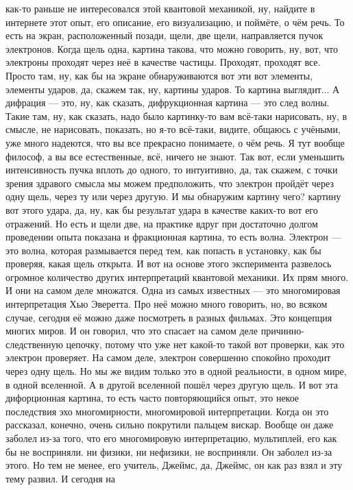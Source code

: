 как-то раньше не интересовался этой квантовой механикой, ну, найдите в интернете
этот опыт, его описание, его визуализацию, и поймёте, о чём речь. То есть на
экран, расположенный позади, щели, две щели, направляется пучок электронов.
Когда щель одна, картина такова, что можно говорить, ну, вот, что электроны
проходят через неё в качестве частицы. Проходят, проходят все. Просто там, ну,
как бы на экране обнаруживаются вот эти вот элементы, элементы ударов, да,
скажем так, ну, картины ударов. То картина выглядит... А дифрация — это, ну, как
сказать, дифрукционная картина — это след волны. Такие там, ну, как сказать,
надо было картинку-то вам всё-таки нарисовать, ну, в смысле, не нарисовать,
показать, но я-то всё-таки, видите, общаюсь с учёными, уже много надеются, что
вы все прекрасно понимаете, о чём речь. Я тут вообще философ, а вы все
естественные, всё, ничего не знают. Так вот, если уменьшить интенсивность пучка
вплоть до одного, то интуитивно, да, так скажем, с точки зрения здравого смысла
мы можем предположить, что электрон пройдёт через одну щель, через ту или через
другую. И мы обнаружим картину чего? картину вот этого удара, да, ну, как бы
результат удара в качестве каких-то вот его отражений. Но есть и щели две, на
практике вдруг при достаточно долгом проведении опыта показана и фракционная
картина, то есть волна. Электрон — это волна, которая размывается перед тем, как
попасть в установку, как бы проверяя, какая щель открыта. И вот на основе этого
эксперимента развелось огромное количество других интерпретаций квантовой
механики. Их прям много. И они на самом деле множатся. Одна из самых известных —
это многомировая интерпретация Хью Эверетта. Про неё можно много говорить, но,
во всяком случае, сегодня её можно даже посмотреть в разных фильмах. Это
концепция многих миров. И он говорил, что это спасает на самом деле причинно-
следственную цепочку, потому что уже нет какой-то такой вот проверки, как это
электрон проверяет. На самом деле, электрон совершенно спокойно проходит через
одну щель. Но мы же видим только это в одной реальности, в одном мире, в одной
вселенной. А в другой вселенной пошёл через другую щель. И вот эта дифорционная
картина, то есть часто повторяющийся опыт, это некое последствия эхо
многомирности, многомировой интерпретации. Когда он это рассказал, конечно,
очень сильно покрутили пальцем вискар. Вообще он даже заболел из-за того, что
его многомировую интерпретацию, мультиплей, его как бы не восприняли. ни физики,
ни нефизики, не восприняли. Он заболел из-за этого. Но тем не менее, его
учитель, Джеймс, да, Джеймс, он как раз взял и эту тему развил. И сегодня на
